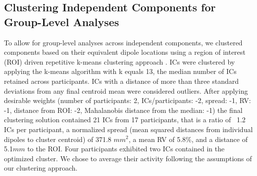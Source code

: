 \subsection{Clustering Independent Components for Group-Level Analyses}
To allow for group-level analyses across independent components, we clustered components based on their equivalent dipole locations using a region of interest (ROI) driven repetitive k-means clustering approach \cite{Gramann2018}. ICs were clustered by applying the k-means algorithm with k equals 13, the median number of ICs retained across participants. ICs with a distance of more than three standard deviations from any final centroid mean were considered outliers. After applying desirable weights (number of participants: 2, ICs/participants: -2, spread: -1, RV: -1, distance from ROI: -2, Mahalanobis distance from the median: -1) the final clustering solution contained 21 ICs from 17 participants, that is a ratio of ~1.2 ICs per participant, a normalized spread (mean squared distances from individual dipoles to cluster centroid) of 371.8 $mm^2$, a mean RV of 5.8\%, and a distance of 5.1$mm$ to the ROI. Four participants exhibited two ICs contained in the optimized cluster. We chose to average their activity following the assumptions of our clustering approach.
